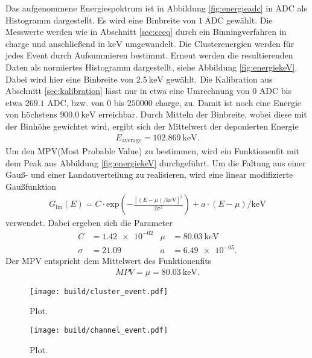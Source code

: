 Das aufgenommene Energiespektrum ist in Abbildung \ref{fig:energieadc} in ADC als
Histogramm dargestellt. Es wird eine Binbreite von $\SI{1}{\text{ADC}}$ gewählt.
Die Messwerte werden wie in Abschnitt \ref{sec:cceq} durch ein Binningverfahren in charge und anschließend
in $\si{\kilo\electronvolt}$ umgewandelt. Die Clusterenergien werden für jedes Event durch Aufsummieren
bestimmt. Erneut werden die resultierenden Daten als normiertes Histogramm dargestellt, siehe Abbildung \ref{fig:energiekeV}. Dabei wird hier eine Binbreite
von $\SI{2.5}{\kilo\electronvolt}$ gewählt. Die Kalibration aus Abschnitt \ref{sec:kalibration} lässt nur in etwa
eine Umrechnung von $0$ ADC bis etwa $269.1$ ADC, bzw. von $0$ bis $250000$ charge, zu. Damit ist noch eine Energie von höchstens
$\SI{900.0}{\kilo\electronvolt}$ erreichbar. Durch Mitteln der Binbreite, wobei diese mit der Binhöhe gewichtet wird,
ergibt sich der Mittelwert der deponierten Energie
\begin{align}
  E_\text{average} = \SI{102.869}{\kilo\electronvolt}.
\end{align}
Um den MPV(Most Probable Value) zu bestimmen, wird ein Funktionenfit mit dem Peak aus Abbildung \ref{fig:energiekeV} durchgeführt.
Um die Faltung aus einer Gauß- und einer Landauverteilung zu realisieren, wird eine linear modifizierte Gaußfunktion
\begin{align}
  G_\text{lin}(E) = C \cdot \text{exp}\left(-\frac{\left[(E-\mu)/\si{\kilo\electronvolt}\right]^2}{2\sigma^2} \right) + a \cdot (E-\mu)/\si{\kilo\electronvolt}
\end{align}
verwendet. Dabei ergeben sich die Parameter
\begin{align}
  C &= \num{1.42e-02} & \mu &= \SI{80.03}{\kilo\electronvolt} \\
  \sigma &= \num{21.09} & a &= \num{6.49e-05}.
\end{align}
Der MPV entspricht dem Mittelwert des Funktionenfits
\begin{align}
  MPV = \mu = \SI{80.03}{\kilo\electronvolt}.
\end{align}

\begin{figure}
  \centering
  \texttt{[image: build/cluster\_event.pdf]}
  \caption{Plot.}
  \label{fig:clusterevent}
\end{figure}

\begin{figure}
  \centering
  \texttt{[image: build/channel\_event.pdf]}
  \caption{Plot.}
  \label{fig:channelevent}
\end{figure}

